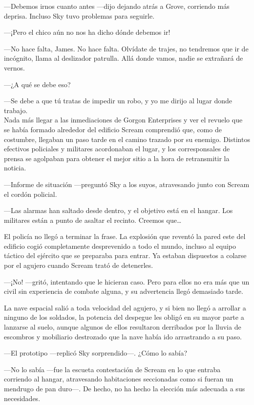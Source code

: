 ---Debemos irnos cuanto antes ---dijo dejando atrás a Grove, corriendo más deprisa. Incluso Sky tuvo problemas para seguirle.

---¡Pero el chico aún no nos ha dicho dónde debemos ir!

---No hace falta, James. No hace falta. Olvídate de trajes, no tendremos que ir de incógnito, llama al deslizador patrulla. Allá donde vamos, nadie se extrañará de vernos.

---¿A qué se debe eso?

---Se debe a que tú tratas de impedir un robo, y yo me dirijo al lugar donde trabajo.\\

\noindent{}Nada más llegar a las inmediaciones de Gorgon Enterprises y ver el revuelo que se había formado alrededor del edificio Scream comprendió que, como de costumbre, llegaban un paso tarde en el camino trazado por su enemigo. Distintos efectivos policiales y militares acordonaban el lugar, y los corresponsales de prensa se agolpaban para obtener el mejor sitio a la hora de retransmitir la noticia.

---Informe de situación ---preguntó Sky a los suyos, atravesando junto con Scream el cordón policial.

---Las alarmas han saltado desde dentro, y el objetivo está en el hangar. Los militares están a punto de asaltar el recinto. Creemos que\dots

El policía no llegó a terminar la frase. La explosión que reventó la pared este del edificio cogió completamente desprevenido a todo el mundo, incluso al equipo táctico del ejército que se preparaba para entrar. Ya estaban dispuestos a colarse por el agujero cuando Scream trató de detenerles.

---¡No! ---gritó, intentando que le hicieran caso. Pero para ellos no era más que un civil sin experiencia de combate alguna, y su advertencia llegó demasiado tarde.

La nave espacial salió a toda velocidad del agujero, y si bien no llegó a arrollar a ninguno de los soldados, la potencia del despegue les obligó en su mayor parte a lanzarse al suelo, aunque algunos de ellos resultaron derribados por la lluvia de escombros y mobiliario destrozado que la nave había ido arrastrando a su paso.

---El prototipo ---replicó Sky sorprendido---. ¿Cómo lo sabía?

---No lo sabía ---fue la escueta contestación de Scream en lo que entraba corriendo al hangar, atravesando habitaciones seccionadas como si fueran un mendrugo de pan duro---. De hecho, no ha hecho la elección más adecuada a sus necesidades.

